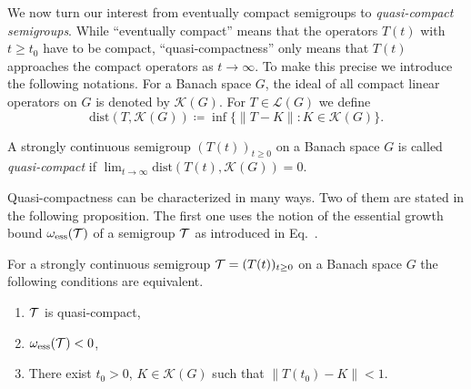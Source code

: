 We now turn our interest from eventually compact semigroups to \emph{quasi-compact semigroups}.
While \enquote{eventually compact} means that the operators $T(t)$ with $t \geq t_{0}$ have to be compact, \enquote{quasi-compactness} only
means that $T(t)$ approaches the compact operators as $t \to \infty$.
To make this precise we introduce the following notations.
For a Banach space $G$, the ideal of all compact linear operators on $G$ is denoted by $\mathcal{K}(G)$.
For $T \in \mathcal{L}(G)$ we define
%
\[
	\text{dist}(T,\mathcal{K}(G))  \coloneq  \inf\{\|T - K\| \colon K \in \mathcal{K}(G)\} .
\]
\begin{definition}\label{def:b4-2.7}
	A strongly continuous semigroup $(T(t))_{t \geq 0}$ on a Banach
	space $G$ is called \emph{quasi-compact} if\/ $\lim_{t\to\infty}\text{dist}(T(t),\mathcal{K}(G)) = 0$.
\end{definition}
Quasi-compactness can be characterized in many ways.
Two of them are stated in the following proposition.
The first one uses the notion of the essential growth bound $\omega_{\text{ess}}(\mathcal{T})$ of a semigroup $\mathcal{T}$ as introduced in Eq.~. 
\begin{proposition}\label{prop:b4-2.8}
	For a strongly continuous semigroup $\TT = (T(t))_{t \geq 0}$
	on a Banach space $G$ the following conditions are equivalent.
	\begin{enumerate}[\upshape (a)]
		\item
		$\mathcal{T}$ is quasi-compact,
	
		\item 
		$\omega_{\mathrm{ess}}(\mathcal{T}) < 0$,
	
		\item 
		There exist $t_{0} > 0$, $K \in \mathcal{K}(G)$ such that $\|T(t_{0}) - K\| < 1$.
	\end{enumerate}
\end{proposition}
